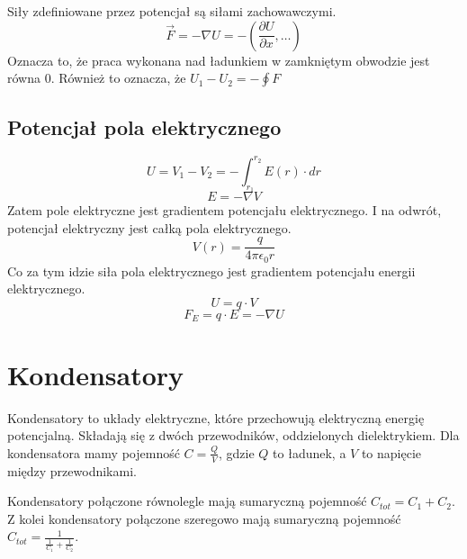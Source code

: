 \documentclass{../notatki}
\begin{document}
Siły zdefiniowane przez potencjał są siłami zachowawczymi.
$$
\vec{F} = - \nabla U = - (\frac{\partial U}{\partial x}, \dots)
$$
Oznacza to, że praca wykonana nad ładunkiem w zamkniętym obwodzie jest równa 0.
Również to oznacza, że $U_1 - U_2 = - \oint F$

\subsection{Potencjał pola elektrycznego}

$$
U = V_1 - V_2 = - \int_{r_1}^{r_2} E(r) \cdot dr
$$
$$
E = - \nabla V
$$
Zatem pole elektryczne jest gradientem potencjału elektrycznego. I na odwrót,
potencjał elektryczny jest całką pola elektrycznego.
$$
V(r) = \frac{q}{4\pi\epsilon_0 r}
$$
Co za tym idzie siła pola elektrycznego jest gradientem potencjału
energii elektrycznego.
$$
U = q \cdot V
$$
$$
F_E = q \cdot E = - \nabla U
$$

\section{Kondensatory}

Kondensatory to układy elektryczne, które przechowują elektryczną energię
potencjalną. Składają się z dwóch przewodników, oddzielonych dielektrykiem.
Dla kondensatora mamy pojemność $C = \frac{Q}{V}$, gdzie $Q$ to ładunek, a $V$
to napięcie między przewodnikami.
\begin{figure*}[h]
  \centering
\end{figure*}
Kondensatory połączone równolegle mają sumaryczną pojemność $C_{tot}
= C_1 + C_2$. Z kolei kondensatory połączone szeregowo mają sumaryczną pojemność
$C_{tot} = \frac{1}{\frac{1}{C_1} + \frac{1}{C_2}}$.
\end{document}
